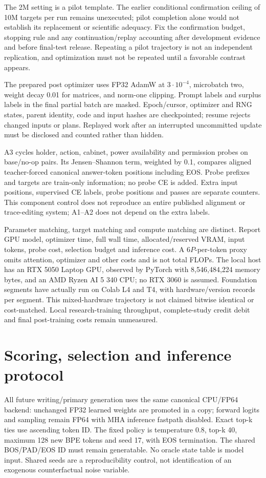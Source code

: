 The 2M setting is a pilot template. The earlier conditional confirmation
ceiling of 10M targets per run remains unexecuted; pilot completion alone would
not establish its replacement or scientific adequacy. Fix the confirmation
budget, stopping rule and any continuation/replay accounting after development
evidence and before final-test release. Repeating a pilot trajectory is not an
independent replication, and optimization must not be repeated until a
favorable contrast appears.

The prepared post optimizer uses FP32 AdamW at $3\cdot10^{-4}$, microbatch two,
weight decay 0.01 for matrices, and norm-one clipping. Prompt labels and surplus
labels in the final partial batch are masked. Epoch/cursor, optimizer and RNG
states, parent identity, code and input hashes are checkpointed; resume rejects
changed inputs or plans. Replayed work after an interrupted uncommitted update
must be disclosed and counted rather than hidden.

A3 cycles holder, action, cabinet, power availability and permission probes on
base/no-op pairs. Its Jensen--Shannon term, weighted by 0.1, compares aligned
teacher-forced canonical answer-token positions including EOS. Probe prefixes
and targets are train-only information; no probe CE is added. Extra input
positions, supervised CE labels, probe positions and passes are separate
counters. This component control does not reproduce an entire published
alignment or trace-editing system; A1--A2 does not depend on the extra labels.

Parameter matching, target matching and compute matching are distinct. Report
GPU model, optimizer time, full wall time, allocated/reserved VRAM, input tokens,
probe cost, selection budget and inference cost. A $6P$-per-token proxy omits
attention, optimizer and other costs and is not total FLOPs. The local host has
an RTX 5050 Laptop GPU, observed by PyTorch with 8,546,484,224 memory bytes,
and an AMD Ryzen AI 5 340 CPU; no RTX 3060 is assumed. Foundation segments have
actually run on Colab L4 and T4, with hardware/version records per segment.
This mixed-hardware trajectory is not claimed bitwise identical or cost-matched.
Local research-training throughput, complete-study credit debit and final
post-training costs remain unmeasured.

\section{Scoring, selection and inference protocol}
All future writing/primary generation uses the same canonical CPU/FP64 backend:
unchanged FP32 learned weights are promoted in a copy; forward logits and
sampling remain FP64 with MHA inference fastpath disabled. Exact top-k ties
use ascending token ID. The fixed policy is temperature 0.8, top-k 40,
maximum 128 new BPE tokens and seed 17, with EOS termination. The shared
BOS/PAD/EOS ID must remain generatable. No oracle state table is model input.
Shared seeds are a reproducibility control, not identification of an exogenous
counterfactual noise variable.

